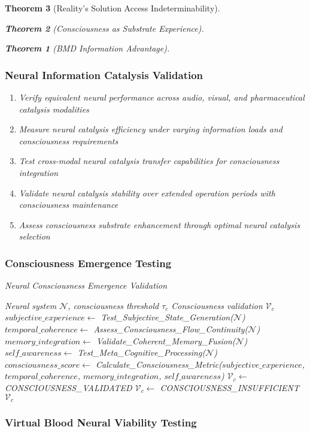 \documentclass[12pt,a4paper]{article}
\newtheorem{theorem}{Theorem}[section]
\theoremstyle{remark}
\begin{document}
\begin{theorem}[Reality's Solution Access Indeterminability]
\begin{theorem}[Consciousness as Substrate Experience]
\begin{theorem}[BMD Information Advantage]
{{{\subsubsection{Neural Information Catalysis Validation}

\begin{enumerate}
\item Verify equivalent neural performance across audio, visual, and pharmaceutical catalysis modalities
\item Measure neural catalysis efficiency under varying information loads and consciousness requirements
\item Test cross-modal neural catalysis transfer capabilities for consciousness integration
\item Validate neural catalysis stability over extended operation periods with consciousness maintenance
\item Assess consciousness substrate enhancement through optimal neural catalysis selection
\end{enumerate}

\subsubsection{Consciousness Emergence Testing}

\begin{algorithm}
\caption{Neural Consciousness Emergence Validation}
\begin{algorithmic}[1]
\REQUIRE Neural system $\mathcal{N}$, consciousness threshold $\tau_c$
\ENSURE Consciousness validation $\mathcal{V}_c$
\STATE $subjective\_experience \leftarrow$ Test\_Subjective\_State\_Generation($\mathcal{N}$)
\STATE $temporal\_coherence \leftarrow$ Assess\_Consciousness\_Flow\_Continuity($\mathcal{N}$)
\STATE $memory\_integration \leftarrow$ Validate\_Coherent\_Memory\_Fusion($\mathcal{N}$)
\STATE $self\_awareness \leftarrow$ Test\_Meta\_Cognitive\_Processing($\mathcal{N}$)
\STATE $consciousness\_score \leftarrow$ Calculate\_Consciousness\_Metric($subjective\_experience$, $temporal\_coherence$, $memory\_integration$, $self\_awareness$)
    \STATE $\mathcal{V}_c \leftarrow$ CONSCIOUSNESS\_VALIDATED
\ELSE
    \STATE $\mathcal{V}_c \leftarrow$ CONSCIOUSNESS\_INSUFFICIENT
\ENDIF
\RETURN $\mathcal{V}_c$
\end{algorithmic}
\end{algorithm}

\subsubsection{Virtual Blood Neural Viability Testing}

}}}
\end{theorem}
\end{theorem}
\end{theorem}
\end{document}
